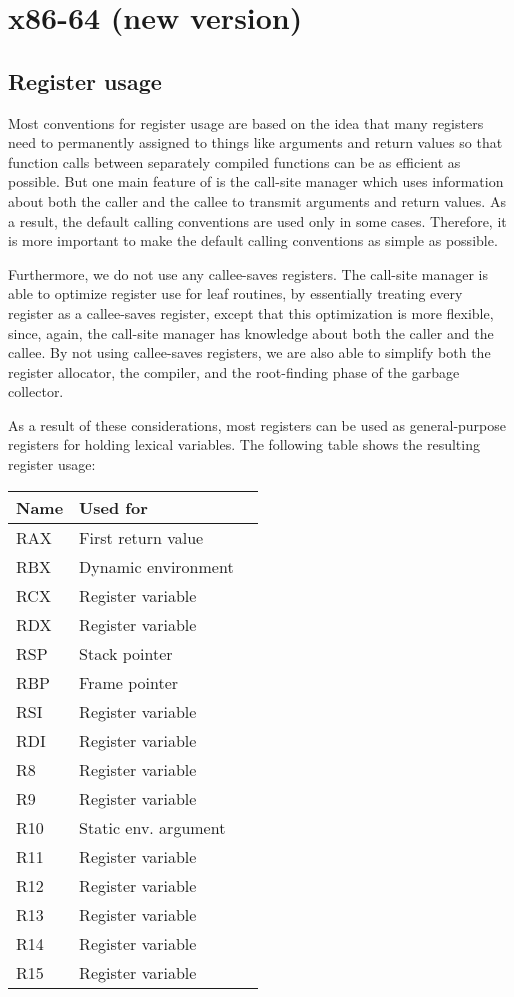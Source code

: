 \chapter{x86-64 (new version)}
\label{chapter-backend-x86-64-new}

\section{Register usage}
\label{sec-backend-x86-64-new-register-use}

Most conventions for register usage are based on the idea that many
registers need to permanently assigned to things like arguments and
return values so that function calls between separately compiled
functions can be as efficient as possible.  But one main feature of
\sysname{} is the call-site manager which uses information about both
the caller and the callee to transmit arguments and return values.  As
a result, the default calling conventions are used only in some
cases.  Therefore, it is more important to make the default calling
conventions as simple as possible.

Furthermore, we do not use any callee-saves registers.  The call-site
manager is able to optimize register use for leaf routines, by
essentially treating every register as a callee-saves register, except
that this optimization is more flexible, since, again, the call-site
manager has knowledge about both the caller and the callee.  By not
using callee-saves registers, we are also able to simplify both the
register allocator, the compiler, and the root-finding phase of the
garbage collector.

As a result of these considerations, most registers can be used as
general-purpose registers for holding lexical variables.  The
following table shows the resulting register usage:

\begin{tabular}{|l|l|l|}
\hline
Name & Used for\\
\hline
\hline
RAX & First return value\\
RBX & Dynamic environment\\
RCX & Register variable\\
RDX & Register variable\\
RSP & Stack pointer \\
RBP & Frame pointer \\
RSI & Register variable\\
RDI & Register variable\\
R8  & Register variable\\
R9  & Register variable\\
R10 & Static env. argument\\
R11 & Register variable\\
R12 & Register variable\\
R13 & Register variable\\
R14 & Register variable\\
R15 & Register variable\\
\hline
\end{tabular}

